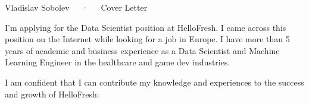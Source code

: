 \documentclass[11pt, a4paper]{awesome-cv}
\newcommand\companyname{HelloFresh}
\begin{document}
\makecvheader[R]

\makecvfooter
  {}
  {Vladislav Sobolev~~~·~~~Cover Letter}
  {}

\makelettertitle

\begin{cvletter}



I'm applying for the Data Scientist position at {\companyname}. I came across this position on the Internet while looking for a job in Europe. I have more than 5 years of academic and business experience as a Data Scientist and Machine Learning Engineer in the healthcare and game dev industries.


I am confident that I can contribute my knowledge and experiences to the success and growth of {\companyname}:

\bigskip
\begin{cvitems}
  

\end{cvitems}
\end{cvletter}
\end{document}
